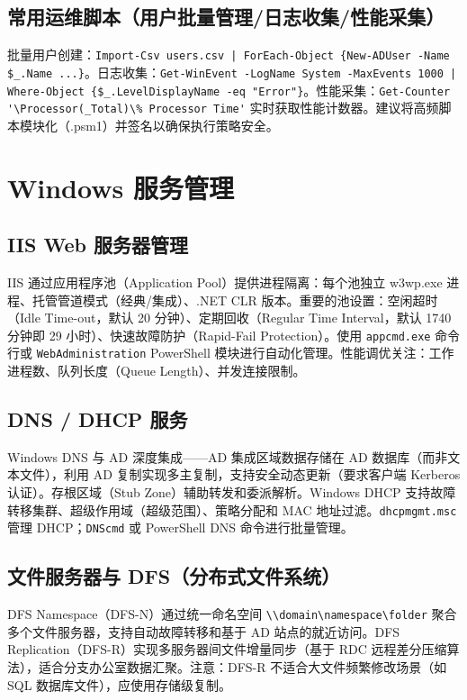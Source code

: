 \documentclass[12pt,UTF8]{ctexbook}
\begin{document}
    \subsection{常用运维脚本（用户批量管理/日志收集/性能采集）}

批量用户创建：\verb+Import-Csv users.csv | ForEach-Object {New-ADUser -Name $_.Name ...}+。日志收集：\verb+Get-WinEvent -LogName System -MaxEvents 1000 | Where-Object {$_.LevelDisplayName -eq "Error"}+。性能采集：\verb+Get-Counter '\Processor(_Total)\% Processor Time'+ 实时获取性能计数器。建议将高频脚本模块化（.psm1）并签名以确保执行策略安全。

  \section{Windows 服务管理}

    \subsection{IIS Web 服务器管理}

IIS 通过应用程序池（Application Pool）提供进程隔离：每个池独立 w3wp.exe 进程、托管管道模式（经典/集成）、.NET CLR 版本。重要的池设置：空闲超时（Idle Time-out，默认 20 分钟）、定期回收（Regular Time Interval，默认 1740 分钟即 29 小时）、快速故障防护（Rapid-Fail Protection）。使用 \texttt{appcmd.exe} 命令行或 \texttt{WebAdministration} PowerShell 模块进行自动化管理。性能调优关注：工作进程数、队列长度（Queue Length）、并发连接限制。

    \subsection{DNS / DHCP 服务}

Windows DNS 与 AD 深度集成——AD 集成区域数据存储在 AD 数据库（而非文本文件），利用 AD 复制实现多主复制，支持安全动态更新（要求客户端 Kerberos 认证）。存根区域（Stub Zone）辅助转发和委派解析。Windows DHCP 支持故障转移集群、超级作用域（超级范围）、策略分配和 MAC 地址过滤。\texttt{dhcpmgmt.msc} 管理 DHCP；\texttt{DNScmd} 或 PowerShell DNS 命令进行批量管理。

    \subsection{文件服务器与 DFS（分布式文件系统）}

DFS Namespace（DFS-N）通过统一命名空间 \texttt{\textbackslash \textbackslash domain\textbackslash namespace\textbackslash folder} 聚合多个文件服务器，支持自动故障转移和基于 AD 站点的就近访问。DFS Replication（DFS-R）实现多服务器间文件增量同步（基于 RDC 远程差分压缩算法），适合分支办公室数据汇聚。注意：DFS-R 不适合大文件频繁修改场景（如 SQL 数据库文件），应使用存储级复制。
\end{document}
